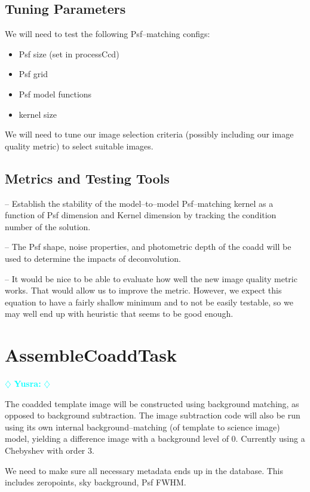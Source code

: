 \documentclass[12pt]{article}
\newcommand{\yusra} { \textcolor{cyan} {
\ensuremath{\diamondsuit} {\bf Yusra:}  
\ensuremath{\diamondsuit} } }
\begin{document}
\subsection{Tuning Parameters}
We will need to test the following Psf--matching configs:
\begin{itemize}
\item Psf size (set in processCcd)
\item Psf grid 
\item Psf model functions
\item kernel size
\end{itemize}

We will need to tune our image selection criteria (possibly including our image quality metric)
to select suitable images.

\subsection{Metrics and Testing Tools}

-- Establish the stability of the model--to--model Psf--matching
kernel as a function of Psf dimension and Kernel dimension by tracking
the condition number of the solution.

-- The Psf shape, noise properties, and photometric depth of the coadd
will be used to determine the impacts of deconvolution.

-- It would be nice to be able to evaluate how well the new image quality metric
works. That would allow us to improve the metric. However, we expect this equation
to have a fairly shallow minimum and to not be easily testable, so we may well end up
with heuristic that seems to be good enough.


\clearpage 
\section{AssembleCoaddTask} \yusra

The coadded template image will be constructed using background
matching, as opposed to background subtraction.  The image subtraction
code will also be run using its own internal background--matching (of
template to science image) model, yielding a difference image with a
background level of 0.  Currently using a Chebyshev with order 3.

We need to make sure all necessary metadata ends up in the database.
This includes zeropoints, sky background, Psf FWHM.
\end{document}
